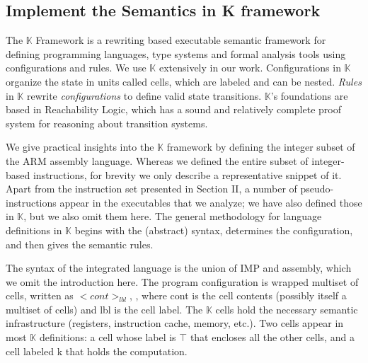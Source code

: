 \documentclass[letterpaper, 10 pt, conference]{IEEEtran}
\begin{document}
\subsection{Implement the Semantics in K framework}
The $\mathbb{K}$ Framework is a rewriting based executable semantic framework for defining programming languages, type systems and formal analysis tools using configurations and rules.  We use $\mathbb{K}$ extensively in our work.
Configurations in $\mathbb{K}$ organize the state in units called cells, which are labeled and can be nested. \emph{Rules} in $\mathbb{K}$ rewrite \emph{configurations} to define valid state transitions. $\mathbb{K}$'s foundations are based in Reachability Logic, which has a sound and relatively complete proof system for
reasoning about transition systems.
\par We give practical insights into the $\mathbb{K}$ framework by defining the integer subset of the ARM assembly language.
 Whereas we defined the entire subset of integer-based instructions, for brevity we only describe a representative snippet of it. Apart from the instruction set presented in Section II, a number of pseudo-instructions
appear in the executables that we analyze; we have also defined those in $\mathbb{K}$, but we also omit them here. The general methodology for language definitions in $\mathbb{K}$ begins with the (abstract) syntax, determines the configuration, and then gives the semantic rules.
\par The syntax of the integrated language is the union of IMP and assembly, which we omit the introduction here. The program configuration is wrapped multiset of cells, written as $<cont>_{lbl}$, , where cont is
the cell contents (possibly itself a multiset of cells) and lbl is the cell label. The $\mathbb{K}$ cells hold the necessary semantic infrastructure (registers, instruction cache, memory, etc.). Two cells appear in most $\mathbb{K}$ definitions: a cell whose label is $\top$ that encloses all the other cells, and a cell labeled k that holds the computation.
\end{document}
